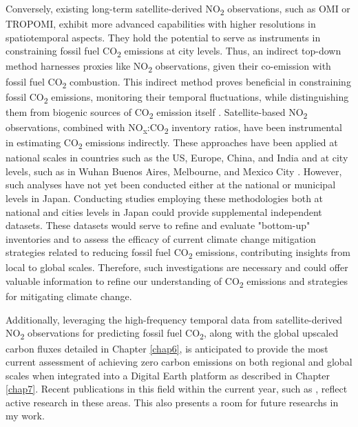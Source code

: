 Conversely, existing long-term satellite-derived NO\textsubscript{2} observations, such as OMI or TROPOMI, exhibit more advanced capabilities with higher resolutions in spatiotemporal aspects. They hold the potential to serve as instruments in constraining fossil fuel CO\textsubscript{2} emissions at city levels. Thus, an indirect top-down method harnesses proxies like NO\textsubscript{2} observations, given their co-emission with fossil fuel CO\textsubscript{2} combustion. This indirect method proves beneficial in constraining fossil CO\textsubscript{2} emissions, monitoring their temporal fluctuations, while distinguishing them from biogenic sources of CO\textsubscript{2} emission itself \citep{ciais2014current, goldberg2019exploiting}. Satellite-based NO\textsubscript{2} observations, combined with NO\textsubscript{x}:CO\textsubscript{2} inventory ratios, have been instrumental in estimating CO\textsubscript{2} emissions indirectly. These approaches have been applied at national scales in countries such as the US, Europe, China, and India \citep{konovalov2016estimation, zheng2020satellite, miyazaki2023predictability} and at city levels, such as in Wuhan \citep{zhang2023quantifying} Buenos Aires, Melbourne, and Mexico City \citep{yang2023using}. However, such analyses have not yet been conducted either at the national or municipal levels in Japan. Conducting studies employing these methodologies both at national and cities levels in Japan could provide supplemental independent datasets. These datasets would serve to refine and evaluate "bottom-up" inventories and to assess the efficacy of current climate change mitigation strategies related to reducing fossil fuel CO\textsubscript{2} emissions, contributing insights from local to global scales. Therefore, such investigations are necessary and could offer valuable information to refine our understanding of CO\textsubscript{2} emissions and strategies for mitigating climate change. \par

Additionally, leveraging the high-frequency temporal data from satellite-derived NO\textsubscript{2} observations for predicting fossil fuel CO\textsubscript{2}, along with the global upscaled carbon fluxes detailed in Chapter \ref{chap6}, is anticipated to provide the most current assessment of achieving zero carbon emissions on both regional and global scales when integrated into a Digital Earth platform as described in Chapter \ref{chap7}. Recent publications in this field within the current year, such as \citep{zhang2023quantifying, yang2023using, miyazaki2023predictability}, reflect active research in these areas. This also presents a room for future researchs in my work.\par